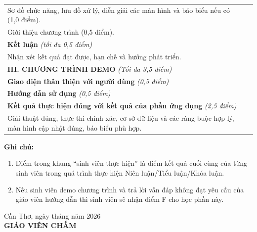 \documentclass[12pt,a4paper,oneside]{report}
\newcommand{\ReportYear}{2026}
\begin{document}
{\begin{tabularx}{\textwidth}{@{}>{\raggedright\arraybackslash}X|p{1.15cm}@{}}
    \quad Sơ đồ chức năng, lưu đồ xử lý, diễn giải các màn hình và báo biểu nếu có (1,0 điểm).                                                 & \\
    \quad Giới thiệu chương trình (0,5 điểm).                                                                                                  & \\
    \hline
    \textbf{Kết luận} \textit{(tối đa 0,5 điểm)}                                                                                               & \\
    \quad Nhận xét kết quả đạt được, hạn chế và hướng phát triển.                                                                              & \\
    \hline
    \textbf{III. CHƯƠNG TRÌNH DEMO} \textit{(Tối đa 3,5 điểm)}                                                                                 & \\
    \hline
    \textbf{Giao diện thân thiện với người dùng} \textit{(0,5 điểm)}                                                                           & \\
    \hline
    \textbf{Hướng dẫn sử dụng} \textit{(0,5 điểm)}                                                                                             & \\
    \hline
    \textbf{Kết quả thực hiện đúng với kết quả của phần ứng dụng} \textit{(2,5 điểm)}                                                          & \\
    \quad Giải thuật đúng, thực thi chính xác, cơ sở dữ liệu và các ràng buộc hợp lý, màn hình cập nhật đúng, báo biểu phù hợp.                & \\
    \hline
  \end{tabularx}

  \vspace{4pt}
  \noindent\textbf{Ghi chú:}
  \begin{enumerate}[leftmargin=0.7cm,label=\arabic*.,itemsep=0pt,topsep=1pt]
    \item Điểm trong khung ``sinh viên thực hiện'' là điểm kết quả cuối cùng của từng sinh viên trong quá trình thực hiện Niên luận/Tiểu luận/Khóa luận.
    \item Nếu sinh viên demo chương trình và trả lời vấn đáp không đạt yêu cầu của giáo viên hướng dẫn thì sinh viên sẽ nhận điểm F cho học phần này.
  \end{enumerate}

  \vspace{4pt}
  \begin{flushright}
    Cần Thơ, ngày \makebox[1.3cm]{\dotfill} tháng \makebox[1.3cm]{\dotfill} năm \ReportYear\\[2pt]
    \textbf{GIÁO VIÊN CHẤM}
  \end{flushright}
}
\clearpage
\end{document}
